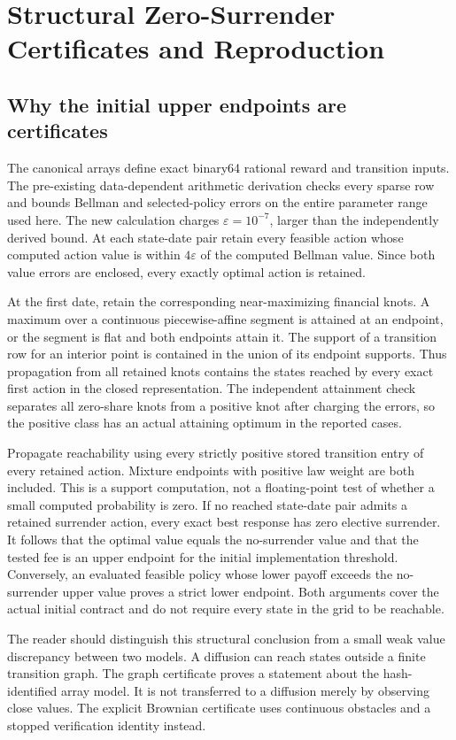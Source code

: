 \section{Structural Zero-Surrender Certificates and Reproduction}
\label{sec:r19-reproduction-proof}
\subsection{Why the initial upper endpoints are certificates}
The canonical arrays define exact binary64 rational reward and transition inputs. The pre-existing data-dependent arithmetic derivation checks every sparse row and bounds Bellman and selected-policy errors on the entire parameter range used here. The new calculation charges $\varepsilon=10^{-7}$, larger than the independently derived bound. At each state-date pair retain every feasible action whose computed action value is within $4\varepsilon$ of the computed Bellman value. Since both value errors are enclosed, every exactly optimal action is retained.

At the first date, retain the corresponding near-maximizing financial knots. A maximum over a continuous piecewise-affine segment is attained at an endpoint, or the segment is flat and both endpoints attain it. The support of a transition row for an interior point is contained in the union of its endpoint supports. Thus propagation from all retained knots contains the states reached by every exact first action in the closed representation. The independent attainment check separates all zero-share knots from a positive knot after charging the errors, so the positive class has an actual attaining optimum in the reported cases.

Propagate reachability using every strictly positive stored transition entry of every retained action. Mixture endpoints with positive law weight are both included. This is a support computation, not a floating-point test of whether a small computed probability is zero. If no reached state-date pair admits a retained surrender action, every exact best response has zero elective surrender. It follows that the optimal value equals the no-surrender value and that the tested fee is an upper endpoint for the initial implementation threshold. Conversely, an evaluated feasible policy whose lower payoff exceeds the no-surrender upper value proves a strict lower endpoint. Both arguments cover the actual initial contract and do not require every state in the grid to be reachable.

The reader should distinguish this structural conclusion from a small weak value discrepancy between two models. A diffusion can reach states outside a finite transition graph. The graph certificate proves a statement about the hash-identified array model. It is not transferred to a diffusion merely by observing close values. The explicit Brownian certificate uses continuous obstacles and a stopped verification identity instead.

